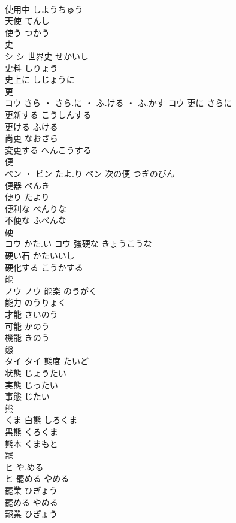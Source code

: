 \documentclass[8pt]{extreport}
\begin{document}
\begin{CJK}{UTF8}{min}
\\	使用中	しようちゅう	
\\	天使	てんし	
\\	使う	つかう	
\\	史	
\\	シ		シ	世界史	せかいし	
\\	史料	しりょう	
\\	史上に	しじょうに	
\\	更	
\\	コウ	さら ・ さら.に ・ ふ.ける ・ ふ.かす	コウ	更に	さらに	
\\	更新する	こうしんする	
\\	更ける	ふける	
\\	尚更	なおさら	
\\	変更する	へんこうする	
\\	便	
\\	ベン ・ ビン	たよ.り	ベン	次の便	つぎのびん	
\\	便器	べんき	
\\	便り	たより	
\\	便利な	べんりな	
\\	不便な	ふべんな	
\\	硬	
\\	コウ	かた.い	コウ	強硬な	きょうこうな	
\\	硬い石	かたいいし	
\\	硬化する	こうかする	
\\	能	
\\	ノウ		ノウ	能楽	のうがく	
\\	能力	のうりょく	
\\	才能	さいのう	
\\	可能	かのう	
\\	機能	きのう	
\\	態	
\\	タイ		タイ	態度	たいど	
\\	状態	じょうたい	
\\	実態	じったい	
\\	事態	じたい	
\\	熊	
\\	くま														白熊	しろくま	
\\	黒熊	くろくま	
\\	熊本	くまもと	
\\	罷	
\\	ヒ	や.める
\\	ヒ	罷める	やめる	
\\	罷業	ひぎょう	
\\	罷める	やめる	
\\	罷業	ひぎょう	

\end{CJK}
\end{document}
